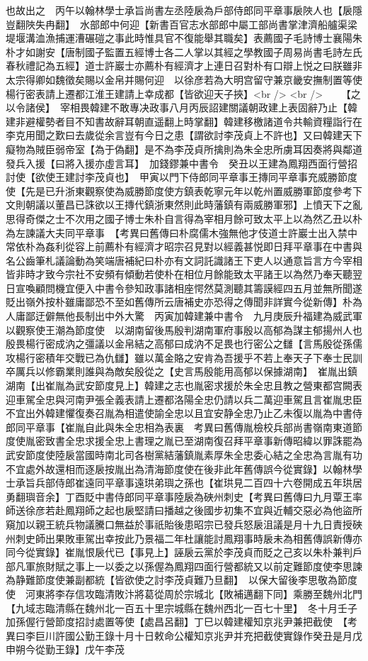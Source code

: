也故出之　丙午以翰林學士承旨尚書左丞陸扆為戶部侍郎同平章事扆陜人也【扆隱豈翻陜失冉翻】　水部郎中何迎【新書百官志水部郎中屬工部尚書掌津濟船艫渠梁堤堰溝洫漁捕運漕碾磑之事此時惟具官不復能舉其職矣】表薦國子毛詩博士襄陽朱朴才如謝安【唐制國子監置五經博士各二人掌以其經之學教國子周易尚書毛詩左氏春秋禮記為五經】道士許巖士亦薦朴有經濟才上連日召對朴有口辯上悦之曰朕雖非太宗得卿如魏徵矣賜以金帛并賜何迎　以徐彦若為大明宫留守兼京畿安撫制置等使楊行密表請上遷都江淮王建請上幸成都【皆欲迎天子挾】<br />
<br />
　　【之以令諸侯】　宰相畏韓建不敢專决政事八月丙辰詔建關議朝政建上表固辭乃止【韓建非避權勢者目不知書故辭耳朝直遥翻上時掌翻】韓建移檄諸道令共輸資糧詣行在李克用聞之歎曰去歲從余言豈有今日之患【謂欲討李茂貞上不許也】又曰韓建天下癡物為賊臣弱帝室【為于偽翻】是不為李茂貞所擒則為朱全忠所虜耳因奏將與鄰道發兵入援【曰將入援亦虛言耳】　加錢鏐兼中書令　癸丑以王建為鳳翔西面行營招討使【欲使王建討李茂貞也】　甲寅以門下侍郎同平章事王摶同平章事充威勝節度使【先是已升浙東觀察使為威勝節度使方鎮表乾寧元年以乾州置威勝軍節度參考下文則朝議以董昌已誅欲以王摶代鎮浙東然則此時藩鎮有兩威勝軍邪】上憤天下之亂思得奇傑之士不次用之國子博士朱朴自言得為宰相月餘可致太平上以為然乙丑以朴為左諫議大夫同平章事　【考異曰舊傳曰朴腐儒木強無他才伎道士許巖士出入禁中常依朴為姦利從容上前薦朴有經濟才昭宗召見對以經義甚悦即日拜平章事在中書與名公齒筆札議論動為笑端唐補紀曰朴亦有文詞託識諸王下吏人以通意旨言方今宰相皆非時才致今宗社不安頻有傾動若使朴在相位月餘能致太平諸王以為然乃奉天聽翌日宣喚顧問機宜便入中書令參知政事諸相座愕然莫測聽其籌謨經四五月並無所聞遂貶出嶺外按朴雖庸鄙恐不至如舊傳所云唐補史亦恐得之傳聞非詳實今從新傳】朴為人庸鄙迂僻無他長制出中外大驚　丙寅加韓建兼中書令　九月庚辰升福建為威武軍以觀察使王潮為節度使　以湖南留後馬殷判湖南軍府事殷以高郁為謀主郁揚州人也殷畏楊行密成汭之彊議以金帛結之高郁曰成汭不足畏也行密公之讎【言馬殷從孫儒攻楊行密積年交戰已為仇讎】雖以萬金賂之安肯為吾援乎不若上奉天子下奉士民訓卒厲兵以修霸業則誰與為敵矣殷從之【史言馬殷能用高郁以保據湖南】　崔胤出鎮湖南【出崔胤為武安節度見上】韓建之志也胤密求援於朱全忠且教之營東都宫闕表迎車駕全忠與河南尹張全義表請上遷都洛陽全忠仍請以兵二萬迎車駕且言崔胤忠臣不宜出外韓建懼復奏召胤為相遣使諭全忠以且宜安静全忠乃止乙未復以胤為中書侍郎同平章事【崔胤自此與朱全忠相為表裏　考異曰舊傳胤檢校兵部尚書嶺南東道節度使胤密致書全忠求援全忠上書理之胤已至湖南復召拜平章事新傳昭緯以罪誅罷為武安節度使陸扆當國時南北司各樹黨結藩鎮胤素厚朱全忠委心結之全忠為言胤有功不宜處外故還相而逐扆按胤出為清海節度使在後非此年舊傳誤今從實錄】以翰林學士承旨兵部侍郎崔遠同平章事遠珙弟璵之孫也【崔珙見二百四十六卷開成五年珙居勇翻璵音余】丁酉貶中書侍郎同平章事陸扆為硤州刺史【考異曰舊傳曰九月覃王率師送徐彦若赴鳳翔師之起也扆堅請曰播越之後國步初集不宜與近輔交惡必為他盜所窺加以親王統兵物議騰口無益於事祇貽後患昭宗已發兵怒扆沮議是月十九日責授硤州刺史師出果敗車駕出幸按此乃景福二年杜讓能討鳳翔事時扆未為相舊傳誤新傳亦同今從實錄】崔胤恨扆代已【事見上】誣扆云黨於李茂貞而貶之己亥以朱朴兼判戶部凡軍旅財賦之事上一以委之以孫偓為鳳翔四面行營都統又以前定難節度使李思諫為静難節度使兼副都統【皆欲使之討李茂貞難乃旦翻】　以保大留後李思敬為節度使　河東將李存信攻臨清敗汴將葛從周於宗城北【敗補邁翻下同】乘勝至魏州北門【九域志臨清縣在魏州北一百五十里宗城縣在魏州西北一百七十里】　冬十月壬子加孫偓行營節度招討處置等使【處昌呂翻】丁巳以韓建權知京兆尹兼把截使　【考異曰李巨川許國公勤王錄十月十日敕命公權知京兆尹并充把截使實錄作癸丑是月戊申朔今從勤王錄】戊午李茂